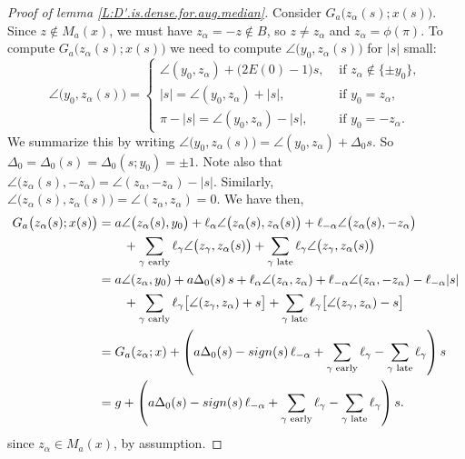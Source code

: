 \documentclass[10pt,a4paper]{amsart}
\begin{document}
\begin{proof}[Proof of lemma \ref{L:D'.is.dense.for.aug.median}]
Consider $G_{a} \bigl( z_{\alpha}(s); x(s) \bigr)$. 
Since $z \notin M_{a}(x)$, we must have $z_{\alpha} = -z \notin B$, 
so $z \neq z_{\alpha}$ and $z_{\alpha} = \phi(\pi)$. 
To compute $G_{a} \bigl( z_{\alpha}(s); x(s) \bigr)$ we need to compute 
$\angle \bigl( y_{0}, z_{\alpha}(s) \bigr)$ for $|s|$ small:
    \begin{equation}  \label{E:angle(y0,z.alpha(s))} 
      \angle \bigl( y_{0}, z_{\alpha}(s) \bigr) =
        \begin{cases}
             \angle ( y_{0}, z_{\alpha} ) + \bigl( 2 E(0) - 1 \bigr) s, 
               &\text{ if } z_{\alpha} \notin \{ \pm y_{0} \}, \\
             |s| = \angle ( y_{0}, z_{\alpha} ) + |s|, &\text{ if } y_{0} = z_{\alpha}, \\
             \pi - |s| = \angle ( y_{0}, z_{\alpha} ) - |s|, &\text{ if } y_{0} = -z_{\alpha} .
        \end{cases}
    \end{equation}
We summarize this by writing 
$\angle \bigl( y_{0}, z_{\alpha}(s) \bigr) = \angle ( y_{0}, z_{\alpha} ) + \Delta_{0} s$. 
So $\Delta_{0} = \Delta_{0}(s) = \Delta_{0}(s;y_{0}) = \pm 1$. Note also that 
$\angle \bigl( z_{\alpha}(s), -z_{\alpha} \bigr) = \angle(z_{\alpha}, -z_{\alpha}) - |s|$. Similarly, 
$\angle \bigl( z_{\alpha}(s), z_{\alpha}(s) ) =  \angle(z_{\alpha}, z_{\alpha}) = 0$. We have then,
    \begin{align}   \label{E:Ga(z.alpha(s),x(s)}
      G_{a} \bigl( z_{\alpha}(s); x(s) \bigr) 
        &= a \angle \bigl( z_{\alpha}(s), y_{0} \bigr) 
          + \ell_{\alpha} \angle \bigl( z_{\alpha}(s), z_{\alpha}(s) \bigr)  
        + \ell_{-\alpha} \angle \bigl( z_{\alpha}(s), -z_{\alpha} \bigr) \notag \\
          & \qquad + \sum_{\gamma \text{ early}} \ell_{\gamma} 
            \angle \bigl(  z_{\gamma}, z_{\alpha}(s) \bigr) 
                + \sum_{\gamma \text{ late}} \ell_{\gamma} 
                  \angle \bigl( z_{\gamma}, z_{\alpha}(s) \bigr) \notag \\
        &= a \angle(z_{\alpha}, y_{0}) + a \Delta_{0}(s) \, s 
          + \ell_{\alpha} \angle( z_{\alpha}, z_{\alpha} )
        + \ell_{-\alpha} \angle(z_{\alpha}, -z_{\alpha}) - \ell_{-\alpha} |s|  \\
          & \qquad + \sum_{\gamma \text{ early}} \ell_{\gamma} 
            \bigl[ \angle( z_{\gamma}, z_{\alpha} ) + s \bigr]
                + \sum_{\gamma \text{ late}} \ell_{\gamma} 
                  \bigl[ \angle( z_{\gamma}, z_{\alpha} ) - s \bigr] \notag \\
        &= G_{a}(z_{\alpha}; x) 
          + \left( a \Delta_{0}(s) - sign(s) \, \ell_{-\alpha} 
            + \sum_{\gamma \text{ early}} \ell_{\gamma} 
              - \sum_{\gamma \text{ late}} \ell_{\gamma} \right) \notag s \\
        &= g + \left( a \Delta_{0}(s) - sign(s) \, \ell_{-\alpha} 
            + \sum_{\gamma \text{ early}} \ell_{\gamma} 
              - \sum_{\gamma \text{ late}} \ell_{\gamma} \right) s \notag .
    \end{align}
since $z_{\alpha} \in M_{a}(x)$, by assumption.


\end{proof}
\end{document}
